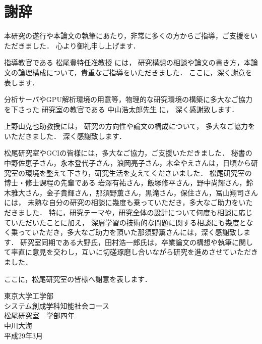 \chapter*{謝辞}
\fancyhf{}
\rhead{}
\lhead{}
\cfoot{\thepage}

本研究の遂行や本論文の執筆にあたり，非常に多くの方からご指導，ご支援をいただきました．
心より御礼申し上げます．
\vvspace

指導教官である 松尾豊特任准教授 には，
研究構想の相談や論文の書き方，本論文の論理構成について，貴重なご指導をいただきました．
ここに，深く謝意を表します．
\vvspace

分析サーバやGPU解析環境の用意等，物理的な研究環境の構築に多大なご協力を下さった
研究室の教官である 中山浩太郎先生 に，
深く感謝致します．
\vvspace

上野山克也助教授には，
研究の方向性や論文の構成について，
多大なご協力をいただきました．
深く感謝致します．
\vvspace

松尾研究室やGCIの皆様には，多大なご協力，ご支援いただきました．
秘書の 中野佐恵子さん，永本登代子さん，浪岡亮子さん，木全やえさんは，日頃から研究室の環境を整えて下さり，研究生活を支えてくださいました．
松尾研究室の博士・修士課程の先輩である 岩澤有祐さん，飯塚修平さん，野中尚輝さん，鈴木雅大さん，金子貴輝さん，那須野薫さん，黒滝さん，保住さん，冨山翔司さんには，
未熟な自分の研究の相談に幾度も乗っていただき，多大なご助力をいただきました．
特に，研究テーマや，研究全体の設計について何度も相談に応じていただいたことに加え，
深層学習の技術的な問題に関する相談にも幾度となく乗っていただき，多大なご助力を頂いた那須野薫さんには，深く感謝致します．
研究室同期である大野氏，田村浩一郎氏は，卒業論文の構想や執筆に関して率直に意見を交わし，互いに切磋琢磨し合いながら研究を進めさせていただきました．

ここに，松尾研究室の皆様へ謝意を表します．
\vvspace





\vvspace
\vvspace
\begin{flushright}
東京大学工学部\\
システム創成学科知能社会コース\\
松尾研究室　学部四年\\
中川大海\\
平成29年3月\\
\end{flushright}
